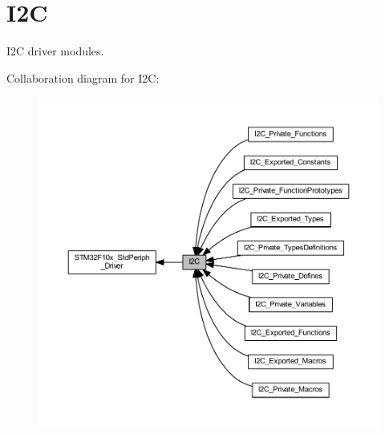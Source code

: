 \hypertarget{group___i2_c}{}\section{I2C}
\label{group___i2_c}


I2C driver modules.  


Collaboration diagram for I2C\+:
\nopagebreak
\begin{figure}[H]
\begin{center}
\leavevmode
\includegraphics[width=350pt]{group___i2_c}
\end{center}
\end{figure}
